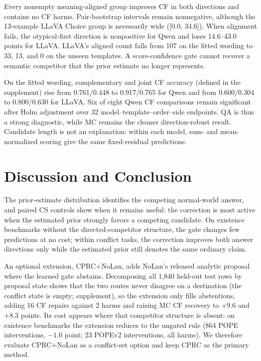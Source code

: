 \documentclass[letterpaper]{article}
\begin{document}
Every nonempty meaning-aligned group improves CF in both directions and contains
no CF harms. Pair-bootstrap intervals remain nonnegative, although the
13-example LLaVA Choice group is necessarily wide ([0.0, 34.6]). When alignment
fails, the atypical-first direction is nonpositive for Qwen and loses
14.6--43.0 points for LLaVA. LLaVA's aligned count falls from 107 on the fitted
wording to 33, 13, and 0 on the unseen templates. A score-confidence gate cannot
recover a semantic competitor that the prior estimate no longer represents.

On the fitted wording, complementary and joint CF accuracy (defined in the
supplement) rise from 0.761/0.448
to 0.917/0.765 for Qwen and from 0.600/0.304 to 0.800/0.630 for LLaVA. Six of
eight Qwen CF comparisons remain significant after Holm adjustment over 32
model--template--order--side endpoints. QA is thus a strong diagnostic,
while MC remains the cleaner direction-robust result. Candidate length is not
an explanation: within each model, sum- and mean-normalized scoring give the
same fixed-residual predictions.

\section{Discussion and Conclusion}

The prior-estimate distribution identifies the competing normal-world answer, and
paired CS controls show when it remains useful: the correction is most
active when the estimated prior strongly favors a competing candidate. On
existence benchmarks without the directed-competitor structure, the gate
changes few predictions at no cost; within conflict tasks, the correction
improves both answer directions only while the estimated prior still denotes
the same ordinary claim.

An optional extension, CPRC+NoLan, adds NoLan's released analytic proposal
where the learned gate abstains. Decomposing all 1,840 held-out test rows by
proposal state shows that the two routes never disagree on a destination (the
conflict state is empty; supplement), so the extension
only fills abstentions, adding 16 CF repairs against 2 harms and raising MC CF
recovery to +9.6 and +8.3 points. Its cost appears where that competitor
structure is absent: on existence benchmarks the extension reduces to the ungated rule (864
POPE interventions, $-1.0$ point; 23 POPEv2 interventions, all harms). We
therefore evaluate CPRC+NoLan as a conflict-set option and keep CPRC as the
primary method.
\end{document}

